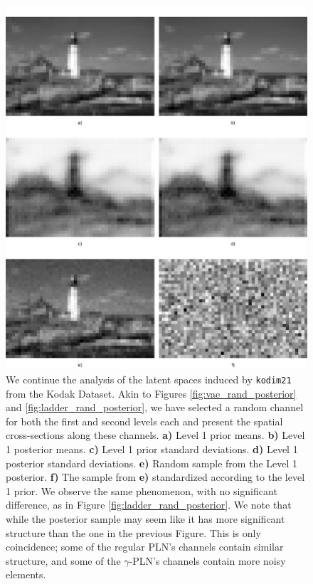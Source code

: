 \documentclass{article}
\begin{document}
\begin{figure}
  \centering
  \includegraphics[width=\textwidth]{../img/plots/vae_latents/gamma_rand_posterior}
  \caption{We continue the analysis of the latent spaces induced by
    \texttt{kodim21} from the Kodak Dataset. Akin to Figures
    \ref{fig:vae_rand_posterior} and \ref{fig:ladder_rand_posterior},
    we have selected a random channel for both the
    first and second levels each and present the spatial cross-sections along these
    channels. \textbf{a)} Level 1 prior means. \textbf{b)} Level 1 posterior means.
    \textbf{c)} Level 1 prior standard deviations. \textbf{d)} Level 1 posterior
    standard deviations. \textbf{e)} Random sample from the Level 1 posterior.
    \textbf{f)} The sample from \textbf{e)} standardized according to the level
    1 prior. We observe the same phenomenon, with no significant difference, as
    in Figure \ref{fig:ladder_rand_posterior}. We note that while the posterior
    sample may seem like it has more significant structure than the one in the
    previous Figure. This is only coincidence; some of the regular PLN's
    channels contain similar structure, and some of the $\gamma$-PLN's channels
    contain more noisy elements.
  }
  \label{fig:gamma_rand_posterior}
\end{figure}
\end{document}
